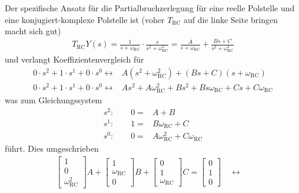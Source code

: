 \begin{Loesung}
\begin{itemize}
Der spezifische Ansatz für die Partialbruchzerlegung für eine reelle Polstelle und eine konjugiert-komplexe Polstelle ist (voher
$T_\mathrm{RC}$ auf die linke Seite bringen macht sich gut)
\begin{align}
T_\mathrm{RC} Y(s) = \frac{1}{s + \omega_\mathrm{RC}} \cdot \frac{s}{s^2+\omega_\mathrm{RC}^2} = \frac{A}{s+\omega_\mathrm{RC}} + \frac{B s + C}{s^2+\omega_\mathrm{RC}^2}
\end{align}
und verlangt Koeffizientenvergleich für
\begin{align}
0 \cdot s^2 + 1 \cdot s^1 + 0 \cdot s^0 \leftrightarrow & A (s^2+\omega_\mathrm{RC}^2) + (B s + C) (s+\omega_\mathrm{RC})\\
0 \cdot s^2 + 1 \cdot s^1 + 0 \cdot s^0 \leftrightarrow & A s^2 + A \omega_\mathrm{RC}^2 + B s^2 + B s \omega_\mathrm{RC} + C s + C \omega_\mathrm{RC}
\end{align}
was zum Gleichungssystem
\begin{align}
s^2: \qquad 0 =& A + B\\
s^1: \qquad 1 =& B \omega_\mathrm{RC} + C\\
s^0: \qquad 0 =& A \omega_\mathrm{RC}^2 + C \omega_\mathrm{RC}
\end{align}
führt. Dies umgeschrieben
%
\begin{align}
\begin{bmatrix}
1 \\ 0 \\ \omega_\mathrm{RC}^2
\end{bmatrix} A +
\begin{bmatrix}
1 \\ \omega_\mathrm{RC} \\ 0
\end{bmatrix} B +
\begin{bmatrix}
0 \\ 1 \\ \omega_\mathrm{RC}
\end{bmatrix} C
=
\begin{bmatrix}
0\\1\\0
\end{bmatrix}
\quad\leftrightarrow\quad

\end{align}
\end{itemize}
\end{Loesung}
